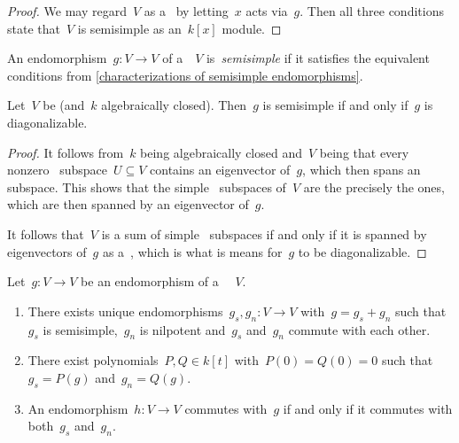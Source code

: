 \begin{proof}
  We may regard~$V$ as a~ by letting~$x$ acts via~$g$.
  Then all three conditions state that~$V$ is semisimple as an~$k[x]$ module.
\end{proof}


\begin{definition}
  An endomorphism~$g \colon V \to V$ of a~~$V$ is~\emph{semisimple} if it satisfies the equivalent conditions from \cref{characterizations of semisimple endomorphisms}.
\end{definition}


\begin{lemma}
  Let~$V$ be  (and~$k$ algebraically closed).
  Then~$g$ is semisimple if and only if~$g$ is diagonalizable.
\end{lemma}


\begin{proof}
  It follows from~$k$ being algebraically closed and~$V$ being  that every nonzero~ subspace~$U \subseteq V$ contains an eigenvector of~$g$, which then spans an ~ subspace.
  This shows that the simple~ subspaces of~$V$ are the precisely the  ones, which are then spanned by an eigenvector of~$g$.
  
  It follows that~$V$ is a sum of simple~ subspaces if and only if it is spanned by eigenvectors of~$g$ as a~, which is what is means for~$g$ to be diagonalizable.
\end{proof}


\begin{proposition}
  \label{jcd}
  Let~$g \colon V \to V$ be an endomorphism of a ~~$V$.
  \begin{enumerate}
    \item
      \label{the jcd itself}
      There exists unique endomorphisms~$g_s, g_n \colon V \to V$ with~$g = g_s + g_n$ such that~$g_s$ is semisimple,~$g_n$ is nilpotent and~$g_s$ and~$g_n$ commute with each other.
    \item
      \label{existence of polynomials}
      There exist polynomials~$P, Q \in k[t]$ with~$P(0) = Q(0) = 0$ such that~$g_s = P(g)$ and~$g_n = Q(g)$.
    \item
      \label{commuting via jcd}
      An endomorphism~$h \colon V \to V$ commutes with~$g$ if and only if it commutes with both~$g_s$ and~$g_n$.
  \end{enumerate}
\end{proposition}


